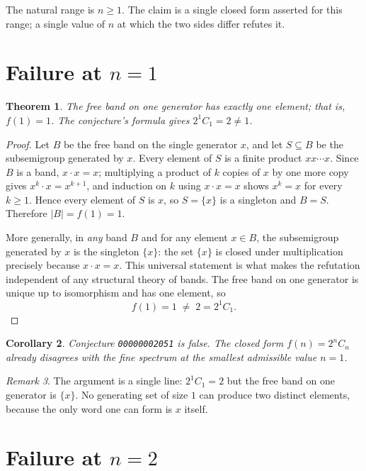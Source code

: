 \documentclass[11pt]{article}
\newtheorem{theorem}{Theorem}
\newtheorem{corollary}[theorem]{Corollary}
\theoremstyle{definition}
\theoremstyle{remark}
\newtheorem{remark}[theorem]{Remark}
\begin{document}
The natural range is $n \ge 1$. The claim is a single closed form asserted for
this range; a single value of $n$ at which the two sides differ refutes it.

\section{Failure at $n = 1$}

\begin{theorem}\label{thm:one}
The free band on one generator has exactly one element; that is, $f(1) = 1$.
The conjecture's formula gives $2^1 C_1 = 2 \ne 1$.
\end{theorem}

\begin{proof}
Let $B$ be the free band on the single generator $x$, and let $S \subseteq B$ be
the subsemigroup generated by $x$. Every element of $S$ is a finite product
$x x \cdots x$. Since $B$ is a band, $x \cdot x = x$; multiplying a product of
$k$ copies of $x$ by one more copy gives $x^k \cdot x = x^{k+1}$, and induction
on $k$ using $x \cdot x = x$ shows $x^k = x$ for every $k \ge 1$. Hence every
element of $S$ is $x$, so $S = \{x\}$ is a singleton and $B = S$. Therefore
$|B| = f(1) = 1$.

More generally, in \emph{any} band $B$ and for any element $x \in B$, the
subsemigroup generated by $x$ is the singleton $\{x\}$: the set $\{x\}$ is
closed under multiplication precisely because $x \cdot x = x$. This universal
statement is what makes the refutation independent of any structural theory of
bands. The free band on one generator is unique up to isomorphism and has one
element, so
\[
f(1) = 1 \;\ne\; 2 = 2^1 C_1 .
\]
\end{proof}

\begin{corollary}
Conjecture \texttt{00000002051} is false. The closed form $f(n) = 2^n C_n$
already disagrees with the fine spectrum at the smallest admissible value
$n = 1$.
\end{corollary}

\begin{remark}
The argument is a single line: $2^1 C_1 = 2$ but the free band on one generator
is $\{x\}$. No generating set of size $1$ can produce two distinct elements,
because the only word one can form is $x$ itself.
\end{remark}

\section{Failure at $n = 2$}
\end{document}
